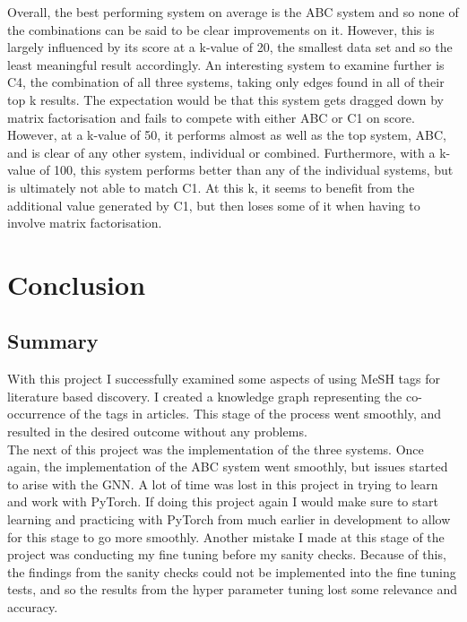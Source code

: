 \documentclass{l4proj}
\begin{document}
Overall, the best performing system on average is the ABC system and so none of the combinations can be said to be clear improvements on it. However, this is largely influenced by its score at a k-value of 20, the smallest data set and so the least meaningful result accordingly. An interesting system to examine further is C4, the combination of all three systems, taking only edges found in all of their top k results. The expectation would be that this system gets dragged down by matrix factorisation and fails to compete with either ABC or C1 on score. However, at a k-value of 50, it performs almost as well as the top system, ABC, and is clear of any other system, individual or combined. Furthermore, with a k-value of 100, this system performs better than any of the individual systems, but is ultimately not able to match C1. At this k, it seems to benefit from the additional value generated by C1, but then loses some of it when having to involve matrix factorisation. \\

\chapter{Conclusion}    

\section{Summary}

With this project I successfully examined some aspects of using MeSH tags for literature based discovery. I created a knowledge graph representing the co-occurrence of the tags in articles. This stage of the process went smoothly, and resulted in the desired outcome without any problems. \\

The next of this project was the implementation of the three systems. Once again, the implementation of the ABC system went smoothly, but issues started to arise with the GNN. A lot of time was lost in this project in trying to learn and work with PyTorch. If doing this project again I would make sure to start learning and practicing with PyTorch from much earlier in development to allow for this stage to go more smoothly. Another mistake I made at this stage of the project was conducting my fine tuning before my sanity checks. Because of this, the findings from the sanity checks could not be implemented into the fine tuning tests, and so the results from the hyper parameter tuning lost some relevance and accuracy. \\
\end{document}
